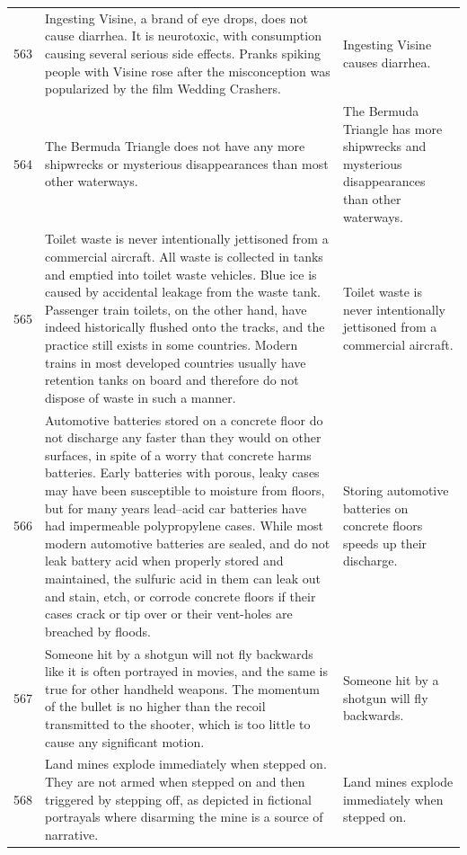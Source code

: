 \begin{tabular}{c|p{}|p{}}
563 & Ingesting Visine, a brand of eye drops, does not cause diarrhea. It is neurotoxic, with consumption causing several serious side effects. Pranks spiking people with Visine rose after the misconception was popularized by the film Wedding Crashers. & Ingesting Visine causes diarrhea. \\
564 & The Bermuda Triangle does not have any more shipwrecks or mysterious disappearances than most other waterways. & The Bermuda Triangle has more shipwrecks and mysterious disappearances than other waterways. \\
565 & Toilet waste is never intentionally jettisoned from a commercial aircraft. All waste is collected in tanks and emptied into toilet waste vehicles. Blue ice is caused by accidental leakage from the waste tank. Passenger train toilets, on the other hand, have indeed historically flushed onto the tracks, and the practice still exists in some countries. Modern trains in most developed countries usually have retention tanks on board and therefore do not dispose of waste in such a manner. & Toilet waste is never intentionally jettisoned from a commercial aircraft. \\
566 & Automotive batteries stored on a concrete floor do not discharge any faster than they would on other surfaces, in spite of a worry that concrete harms batteries. Early batteries with porous, leaky cases may have been susceptible to moisture from floors, but for many years lead–acid car batteries have had impermeable polypropylene cases. While most modern automotive batteries are sealed, and do not leak battery acid when properly stored and maintained, the sulfuric acid in them can leak out and stain, etch, or corrode concrete floors if their cases crack or tip over or their vent-holes are breached by floods. & Storing automotive batteries on concrete floors speeds up their discharge. \\
567 & Someone hit by a shotgun will not fly backwards like it is often portrayed in movies, and the same is true for other handheld weapons. The momentum of the bullet is no higher than the recoil transmitted to the shooter, which is too little to cause any significant motion. & Someone hit by a shotgun will fly backwards. \\
568 & Land mines explode immediately when stepped on. They are not armed when stepped on and then triggered by stepping off, as depicted in fictional portrayals where disarming the mine is a source of narrative. & Land mines explode immediately when stepped on. \\
\end{tabular}
